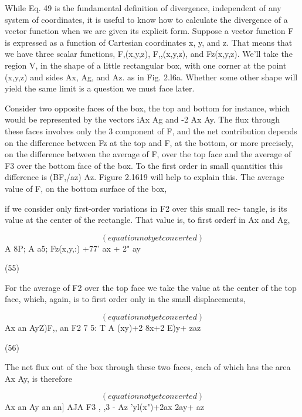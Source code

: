 While Eq. 49 is the fundamental definition of divergence, independent
of any system of coordinates, it is useful to know how to
calculate the divergence of a vector function when we are given its
explicit form. Suppose a vector function F is expressed as a function
of Cartesian coordinates x, y, and z. That means that we have three
scalar functions, F,(x,y,z), F,,(x,y,z), and Fz(x,y,z). We'll take the
region V, in the shape of a little rectangular box, with one corner at
the point (x,y,z) and sides Ax, Ag, and Az. as in Fig. 2.l6a. Whether
some other shape will yield the same limit is a question we must face
later.

Consider two opposite faces of the box, the top and bottom for
instance, which would be represented by the vectors iAx Ag and
-2 Ax Ay. The flux through these faces involves only the 3 component
of F, and the net contribution depends on the difference between
Fz at the top and F, at the bottom, or more precisely, on the
difference between the average of F, over the top face and the average
of F3 over the bottom face of the box. To the first order in small
quantities this difference is (BF,/az) Az. Figure 2.1619 will help to explain
this. The average value of F, on the bottom surface of the box,

if we consider only first-order variations in F2 over this small rec-
tangle, is its value at the center of the rectangle. That value is, to
first orderf in Ax and Ag,

\begin{equation}
(equation not yet converted)
\end{equation}
A 8P; A a5;
Fz(x,y,:) +77' ax + 2" ay

(55)

For the average of F2 over the top face we take the value at the
center of the top face, which, again, is to first order only in the small
displacements,

\begin{equation}
(equation not yet converted)
\end{equation}
Ax an AyZ)F,, an
F2 7 5: T A
(xy)+2 8x+2 E)y+ zaz

(56)

The net flux out of the box through these two faces, each of which has
the area Ax Ay, is therefore

\begin{equation}
(equation not yet converted)
\end{equation}
Ax an Ay an an]
AJA F3 , ,3 - Az
'yl(x")+2ax 2ay+ az

